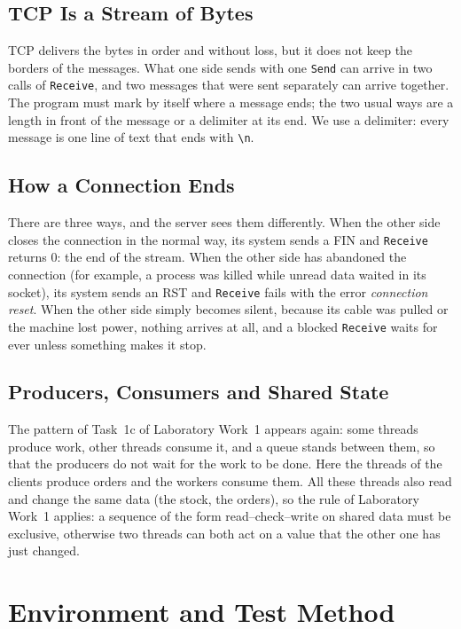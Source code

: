 \documentclass[12pt,a4paper]{article}
\begin{document}
\subsection{TCP Is a Stream of Bytes}

TCP delivers the bytes in order and without loss, but it does not keep the borders of the messages. What one side sends with one \texttt{Send} can arrive in two calls of \texttt{Receive}, and two messages that were sent separately can arrive together. The program must mark by itself where a message ends; the two usual ways are a length in front of the message or a delimiter at its end. We use a delimiter: every message is one line of text that ends with \texttt{\textbackslash n}.

\subsection{How a Connection Ends}

There are three ways, and the server sees them differently. When the other side closes the connection in the normal way, its system sends a FIN and \texttt{Receive} returns 0: the end of the stream. When the other side has abandoned the connection (for example, a process was killed while unread data waited in its socket), its system sends an RST and \texttt{Receive} fails with the error \textit{connection reset}. When the other side simply becomes silent, because its cable was pulled or the machine lost power, nothing arrives at all, and a blocked \texttt{Receive} waits for ever unless something makes it stop.

\subsection{Producers, Consumers and Shared State}

The pattern of Task~1c of Laboratory Work~1 appears again: some threads produce work, other threads consume it, and a queue stands between them, so that the producers do not wait for the work to be done. Here the threads of the clients produce orders and the workers consume them. All these threads also read and change the same data (the stock, the orders), so the rule of Laboratory Work~1 applies: a sequence of the form read--check--write on shared data must be exclusive, otherwise two threads can both act on a value that the other one has just changed.

\section{Environment and Test Method}
\end{document}
